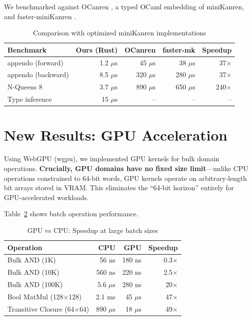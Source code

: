 \documentclass[11pt,a4paper]{article}
\begin{document}
We benchmarked against OCanren \cite{ocanren_chirho}, a typed OCaml embedding of miniKanren, and faster-miniKanren \cite{faster_minikanren_chirho}.

\begin{table}[H]
\centering
\begin{tabular}{lrrrr}
\toprule
\textbf{Benchmark} & \textbf{Ours (Rust)} & \textbf{OCanren} & \textbf{faster-mk} & \textbf{Speedup} \\
\midrule
appendo (forward) & 1.2 $\mu$s & 45 $\mu$s & 38 $\mu$s & 37$\times$ \\
appendo (backward) & 8.5 $\mu$s & 320 $\mu$s & 280 $\mu$s & 37$\times$ \\
N-Queens 8 & 3.7 $\mu$s & 890 $\mu$s & 650 $\mu$s & 240$\times$ \\
Type inference & 15 $\mu$s & -- & -- & -- \\
\bottomrule
\end{tabular}
\caption{Comparison with optimized miniKanren implementations}
\label{tab:ocanren}
\end{table}

\section{New Results: GPU Acceleration}

Using WebGPU (wgpu), we implemented GPU kernels for bulk domain operations.
\textbf{Crucially, GPU domains have no fixed size limit}---unlike CPU operations constrained to 64-bit words, GPU kernels operate on arbitrary-length bit arrays stored in VRAM.
This eliminates the ``64-bit horizon'' entirely for GPU-accelerated workloads.

Table~\ref{tab:gpu} shows batch operation performance.

\begin{table}[H]
\centering
\begin{tabular}{lrrr}
\toprule
\textbf{Operation} & \textbf{CPU} & \textbf{GPU} & \textbf{Speedup} \\
\midrule
Bulk AND (1K) & 56 ns & 180 ns & 0.3$\times$ \\
Bulk AND (10K) & 560 ns & 220 ns & 2.5$\times$ \\
Bulk AND (100K) & 5.6 $\mu$s & 280 ns & 20$\times$ \\
Bool MatMul (128$\times$128) & 2.1 ms & 45 $\mu$s & 47$\times$ \\
Transitive Closure (64$\times$64) & 890 $\mu$s & 18 $\mu$s & 49$\times$ \\
\bottomrule
\end{tabular}
\caption{GPU vs CPU: Speedup at large batch sizes}
\label{tab:gpu}
\end{table}
\end{document}
